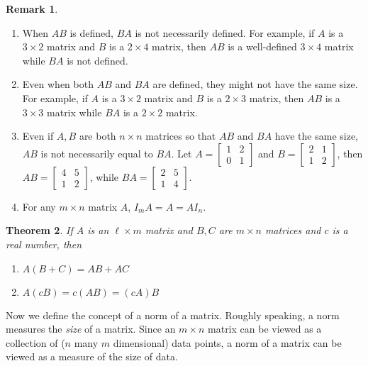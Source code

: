 \documentclass[12pt,letterpaper]{book}
\numberwithin{equation}{section}
\newtheorem{thm}{\textbf{Theorem}}[section]
\theoremstyle{definition}
\newtheorem{remark}[thm]{\textbf{Remark}}
\begin{document}
\begin{remark}\quad
\begin{enumerate}
\item When $AB$ is defined, $BA$ is not necessarily defined. For example, if $A$ is a $3\times 2$ matrix and $B$ is a $2\times 4$ matrix, then $AB$ is a well-defined $3\times 4$ matrix while $BA$ is not defined.
\item Even when both $AB$ and $BA$ are defined, they might not have the same
size. For example, if $A$ is a $3\times 2$ matrix and $B$ is a $2\times 3$ matrix, then $AB$ is a $3\times 3$ matrix while $BA$ is a $2\times 2$ matrix.
\item Even if $A,B$ are both $n\times n$ matrices so that $AB$ and $BA$ have the same size, $AB$ is not necessarily equal to $BA$. Let $A=\left[\begin{array}{rr} 1 & 2 \\ 0 & 1 \end{array}\right]$ and $B=\left[\begin{array}{rr} 2 & 1 \\ 1 & 2 \end{array}\right]$, then $AB=\left[\begin{array}{rr} 4 & 5 \\ 1 & 2 \end{array}\right]$, while $BA=\left[\begin{array}{rr} 2 & 5 \\ 1 & 4 \end{array}\right]$.
\item For any $m\times n$ matrix $A$, $I_mA=A=AI_n$.
\end{enumerate}
\end{remark}

\begin{thm} If $A$ is an $\ell\times m$ matrix and $B,C$ are $m\times n$ matrices and $c$ is a real number, then
\begin{enumerate}
\item $A(B+C)=AB+AC$
\item $A(cB)=c(AB)=(cA)B$
\end{enumerate}
\end{thm}

Now we define the concept of a norm of a matrix. Roughly speaking, a norm measures the \textit{size} of a matrix. Since an $m\times n$ matrix can be viewed as a collection of ($n$ many $m$ dimensional) data points, a norm of a matrix can be viewed as a measure of the size of data.
\end{document}
